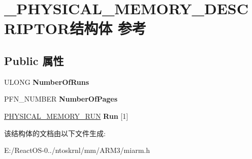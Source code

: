 \hypertarget{struct___p_h_y_s_i_c_a_l___m_e_m_o_r_y___d_e_s_c_r_i_p_t_o_r}{}\section{\+\_\+\+P\+H\+Y\+S\+I\+C\+A\+L\+\_\+\+M\+E\+M\+O\+R\+Y\+\_\+\+D\+E\+S\+C\+R\+I\+P\+T\+O\+R结构体 参考}
\label{struct___p_h_y_s_i_c_a_l___m_e_m_o_r_y___d_e_s_c_r_i_p_t_o_r}
\subsection*{Public 属性}
\begin{DoxyCompactItemize}
\item 
\mbox{\label{struct___p_h_y_s_i_c_a_l___m_e_m_o_r_y___d_e_s_c_r_i_p_t_o_r_ac0aac7baf941c5173402a3367b27567b}} 
U\+L\+O\+NG {\bfseries Number\+Of\+Runs}
\item 
\mbox{\label{struct___p_h_y_s_i_c_a_l___m_e_m_o_r_y___d_e_s_c_r_i_p_t_o_r_a1dc536defafe2479f42b945f0ace73e8}} 
P\+F\+N\+\_\+\+N\+U\+M\+B\+ER {\bfseries Number\+Of\+Pages}
\item 
\mbox{\label{struct___p_h_y_s_i_c_a_l___m_e_m_o_r_y___d_e_s_c_r_i_p_t_o_r_ac92c77652999eb7f2ea381d6d1befc6b}} 
\hyperlink{struct___p_h_y_s_i_c_a_l___m_e_m_o_r_y___r_u_n}{P\+H\+Y\+S\+I\+C\+A\+L\+\_\+\+M\+E\+M\+O\+R\+Y\+\_\+\+R\+UN} {\bfseries Run} \mbox{[}1\mbox{]}
\end{DoxyCompactItemize}


该结构体的文档由以下文件生成\+:\begin{DoxyCompactItemize}
\item 
E\+:/\+React\+O\+S-\/0../ntoskrnl/mm/\+A\+R\+M3/miarm.\+h\end{DoxyCompactItemize}
